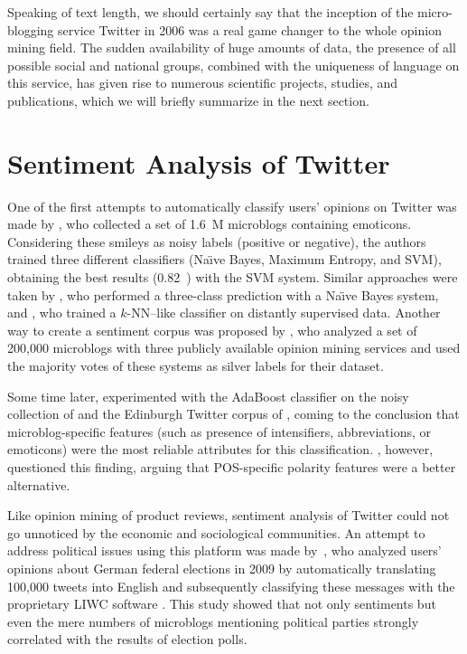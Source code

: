 
Speaking of text length, we should certainly say that the inception of
the micro-blogging service Twitter in 2006 was a real game changer to
the whole opinion mining field.  The sudden availability of huge
amounts of data, the presence of all possible social and national
groups, combined with the uniqueness of language on this service, has
given rise to numerous scientific projects, studies, and publications,
which we will briefly summarize in the next section.

\section{Sentiment Analysis of Twitter}\label{snt:subsec:intro:saot}

One of the first attempts to automatically classify users' opinions on
Twitter was made by \citet{Go:09}, who collected a set of 1.6~M
microblogs containing emoticons.  Considering these smileys as noisy
labels (positive or negative), the authors trained three different
classifiers (Na\"{\i}ve Bayes, Maximum Entropy, and SVM), obtaining
the best results (0.82~\F{}) with the SVM system.  Similar approaches
were taken by \citet{Pak:10}, who performed a three-class prediction
with a Na\"{\i}ve Bayes system, and \citet{Davidov:10}, who trained a
$k$-NN--like classifier on distantly supervised data. Another way to
create a sentiment corpus was proposed by \citet{Barbosa:10}, who
analyzed a set of 200,000 microblogs with three publicly available
opinion mining services and used the majority votes of these systems
as silver labels for their dataset.

Some time later, \citet{Kouloumpis:11} experimented with the AdaBoost
classifier on the noisy collection of \citet{Go:09} and the Edinburgh
Twitter corpus of \citet{Petrovic:10}, coming to the conclusion that
microblog-specific features (such as presence of intensifiers,
abbreviations, or emoticons) were the most reliable attributes for
this classification.  \citet{Agarwal:11}, however, questioned this
finding, arguing that POS-specific polarity features were a better
alternative.

Like opinion mining of product reviews, sentiment analysis of Twitter
could not go unnoticed by the economic and sociological communities.
An attempt to address political issues using this platform was made
by~\citet{Tumasjan:10}, who analyzed users' opinions about German
federal elections in 2009 by automatically translating 100,000 tweets
into English and subsequently classifying these messages with the
proprietary LIWC software \cite{Pannebaker:07}.  This study showed
that not only sentiments but even the mere numbers of microblogs
mentioning political parties strongly correlated with the results of
election polls.

